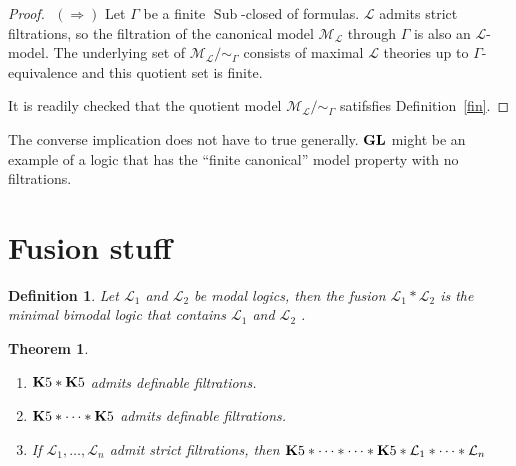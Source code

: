 \documentclass[a4paper]{article}
\theoremstyle{defin}
\newtheorem{defin}{Definition}
\theoremstyle{theorem}
\newtheorem{theorem}{Theorem}
\theoremstyle{prop}
\theoremstyle{lemma}
\theoremstyle{fact}
\theoremstyle{ex}
\theoremstyle{col}
\theoremstyle{claim}
\begin{document}
\begin{proof}
  $ $
$(\Rightarrow)$
  Let $\Gamma$ be a finite $\operatorname{Sub}$-closed of formulas. $\mathcal{L}$ admits strict filtrations, so the filtration of the canonical model $\mathcal{M}_{\mathcal{L}}$ through $\Gamma$ is also an $\mathcal{L}$-model. The underlying set of $\mathcal{M}_{\mathcal{L}} / \sim_{\Gamma}$ consists of maximal $\mathcal{L}$ theories up to $\Gamma$-equivalence and this quotient set is finite.

  It is readily checked that the quotient model $\mathcal{M}_{\mathcal{L}} / \sim_{\Gamma}$ satifsfies Definition~\ref{fin}.
\end{proof}

The converse implication does not have to true generally. ${\bf GL}$ might be an example of a logic that has the ``finite canonical'' model property with no filtrations.

\section{Fusion stuff}

\begin{defin}
  Let $\mathcal{L}_1$ and $\mathcal{L}_2$ be modal logics, then the fusion $\mathcal{L}_1 * \mathcal{L}_2$ is the minimal bimodal logic that contains $\mathcal{L}_1$ and $\mathcal{L}_2$ \cite{kurucz200715}.
\end{defin}

\begin{theorem}
  $ $

  \begin{enumerate}
  \item ${\bf K}5 * {\bf K}5$ admits definable filtrations.
  \item ${\bf K}5 * \dots * {\bf K}5$ admits definable filtrations.
  \item If $\mathcal{L}_1, \dots, \mathcal{L}_n$ admit strict filtrations, then ${\bf K}5 * \dots * \dots * {\bf K}5 * \mathcal{L}_1 * \dots * \mathcal{L}_n$
  \end{enumerate}
\end{theorem}
\end{document}
